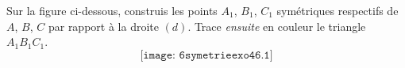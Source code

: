 Sur la figure ci-dessous, construis les points $A_1$, $B_1$, $C_1$
symétriques respectifs de $A$, $B$, $C$ par rapport à la droite $(d)$.
Trace {\em ensuite} en couleur le triangle $A_1B_1C_1$.
\[\texttt{[image: 6symetrieexo46.1]}\]